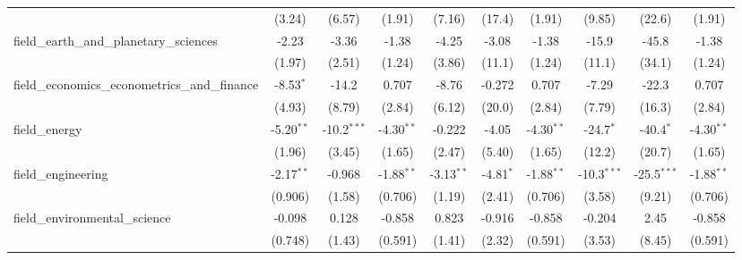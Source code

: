 \begin{tabular}{lccccccccc}
                                                               & (3.24)         & (6.57)         & (1.91)        & (7.16)         & (17.4)         & (1.91)        & (9.85)        & (22.6)        & (1.91)\\   
   field\_earth\_and\_planetary\_sciences                      & -2.23          & -3.36          & -1.38         & -4.25          & -3.08          & -1.38         & -15.9         & -45.8         & -1.38\\   
                                                               & (1.97)         & (2.51)         & (1.24)        & (3.86)         & (11.1)         & (1.24)        & (11.1)        & (34.1)        & (1.24)\\   
   field\_economics\_econometrics\_and\_finance                & -8.53$^{*}$    & -14.2          & 0.707         & -8.76          & -0.272         & 0.707         & -7.29         & -22.3         & 0.707\\   
                                                               & (4.93)         & (8.79)         & (2.84)        & (6.12)         & (20.0)         & (2.84)        & (7.79)        & (16.3)        & (2.84)\\   
   field\_energy                                               & -5.20$^{**}$   & -10.2$^{***}$  & -4.30$^{**}$  & -0.222         & -4.05          & -4.30$^{**}$  & -24.7$^{*}$   & -40.4$^{*}$   & -4.30$^{**}$\\   
                                                               & (1.96)         & (3.45)         & (1.65)        & (2.47)         & (5.40)         & (1.65)        & (12.2)        & (20.7)        & (1.65)\\   
   field\_engineering                                          & -2.17$^{**}$   & -0.968         & -1.88$^{**}$  & -3.13$^{**}$   & -4.81$^{*}$    & -1.88$^{**}$  & -10.3$^{***}$ & -25.5$^{***}$ & -1.88$^{**}$\\   
                                                               & (0.906)        & (1.58)         & (0.706)       & (1.19)         & (2.41)         & (0.706)       & (3.58)        & (9.21)        & (0.706)\\   
   field\_environmental\_science                               & -0.098         & 0.128          & -0.858        & 0.823          & -0.916         & -0.858        & -0.204        & 2.45          & -0.858\\   
                                                               & (0.748)        & (1.43)         & (0.591)       & (1.41)         & (2.32)         & (0.591)       & (3.53)        & (8.45)        & (0.591)\\   

\end{tabular}
